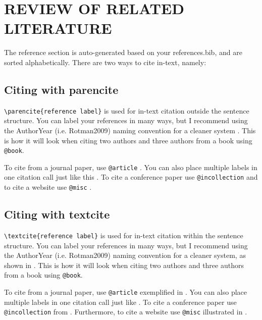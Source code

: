 \section{REVIEW OF RELATED LITERATURE}
\label{sec:REVIEW OF RELATED LITERATURE}

The reference section is auto-generated based on your references.bib, and are sorted alphabetically. There are two ways to cite in-text, namely:

\subsection{Citing with parencite}

\verb|\parencite{reference label}| is used for in-text citation outside the sentence structure. You can label your references in many ways, but I recommend using the AuthorYear (i.e. Rotman2009) naming convention for a cleaner system \parencite{Rotman2009}. This is how it will look when citing two authors \parencite{booktwoauthors} and three authors \parencite{bookthreeauthors} from a book using \verb|@book|.

To cite from a journal paper, use \verb|@article| \parencite{journalarticleoneauthor}. You can also place multiple labels in one citation call just like this \parencite{journalarticletwoauthors, journalarticlethreeauthors}. To cite a conference paper use \verb|@incollection| \parencite{conferencearticle} and to cite a website use \verb|@misc| \parencite{website}.


\subsection{Citing with textcite}

\verb|\textcite{reference label}| is used for in-text citation within the sentence structure. You can label your references in many ways, but I recommend using the AuthorYear (i.e. Rotman2009) naming convention for a cleaner system, as shown in \textcite{Rotman2009}. This is how it will look when citing two authors \textcite{booktwoauthors} and three authors \textcite{bookthreeauthors} from a book using \verb|@book|.

To cite from a journal paper, use \verb|@article| exemplified in \textcite{journalarticleoneauthor}. You can also place multiple labels in one citation call just like \textcite{journalarticletwoauthors, journalarticlethreeauthors}. To cite a conference paper use \verb|@incollection| from \textcite{conferencearticle}. Furthermore, to cite a website use \verb|@misc| illustrated in \textcite{website}.